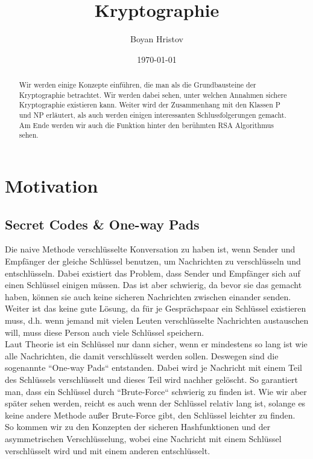 \documentclass[12pt,a4paper]{article}
\author{Boyan Hristov}
\title{Kryptographie}
\date{\today}
\theoremstyle{definition}
\begin{document}
    \maketitle
    \begin{abstract}
        Wir werden einige Konzepte einführen, die man als die Grundbausteine der Kryptographie betrachtet. Wir werden
        dabei sehen, unter welchen Annahmen sichere Kryptographie existieren kann. Weiter wird der Zusammenhang mit den
        Klassen P und NP erläutert, als auch werden einigen interessanten Schlussfolgerungen gemacht. Am Ende werden
        wir auch die Funktion hinter den berühmten RSA Algorithmus sehen.
    \end{abstract}
    \section{Motivation}

    \subsection{Secret Codes \& One-way Pads}
    Die naive Methode verschlüsselte Konversation zu haben ist, wenn Sender und Empfänger der gleiche Schlüssel benutzen,
    um Nachrichten zu verschlüsseln und entschlüsseln. Dabei existiert das Problem, dass Sender und Empfänger sich auf
    einen Schlüssel einigen müssen. Das ist aber schwierig, da bevor sie das gemacht haben, können sie auch keine
    sicheren Nachrichten zwischen einander senden. Weiter ist das keine gute Lösung, da für je Gesprächspaar ein
    Schlüssel existieren muss, d.h. wenn jemand mit vielen Leuten verschlüsselte Nachrichten austauschen will, muss diese
    Person auch viele Schlüssel speichern. \\

    Laut Theorie ist ein Schlüssel nur dann sicher, wenn er mindestens so lang ist wie alle Nachrichten, die damit
    verschlüsselt werden sollen. Deswegen sind die sogenannte ``One-way Pads`` entstanden. Dabei wird je Nachricht mit
    einem Teil des Schlüssels verschlüsselt und dieses Teil wird nachher gelöscht. So garantiert man, dass ein
    Schlüssel durch ``Brute-Force`` schwierig zu finden ist. Wie wir aber später sehen werden, reicht es auch wenn der
    Schlüssel relativ lang ist, solange es keine andere Methode außer Brute-Force gibt, den Schlüssel leichter zu
    finden. \\

    So kommen wir zu den Konzepten der sicheren Hashfunktionen und der asymmetrischen Verschlüsselung,
    wobei eine Nachricht mit einem Schlüssel verschlüsselt wird und mit einem anderen entschlüsselt.
\end{document}
